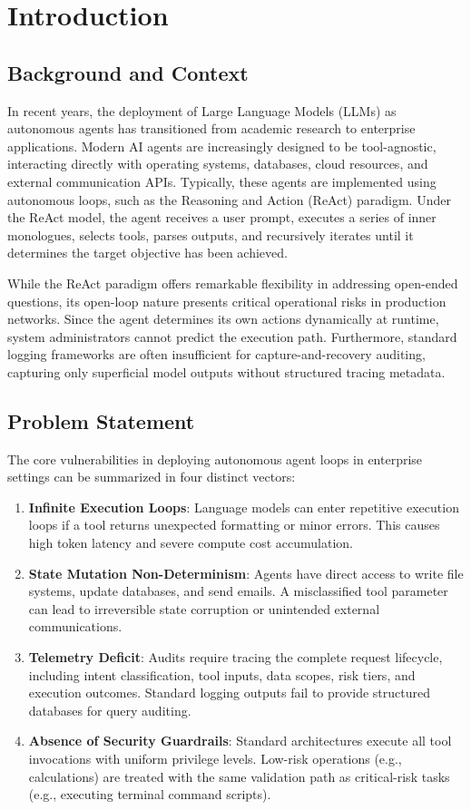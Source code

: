 \documentclass{article}
\begin{document}
\section{Introduction}

\subsection{Background and Context}
In recent years, the deployment of Large Language Models (LLMs) as autonomous agents has transitioned from academic research to enterprise applications. Modern AI agents are increasingly designed to be tool-agnostic, interacting directly with operating systems, databases, cloud resources, and external communication APIs. Typically, these agents are implemented using autonomous loops, such as the Reasoning and Action (ReAct) paradigm. Under the ReAct model, the agent receives a user prompt, executes a series of inner monologues, selects tools, parses outputs, and recursively iterates until it determines the target objective has been achieved. 

While the ReAct paradigm offers remarkable flexibility in addressing open-ended questions, its open-loop nature presents critical operational risks in production networks. Since the agent determines its own actions dynamically at runtime, system administrators cannot predict the execution path. Furthermore, standard logging frameworks are often insufficient for capture-and-recovery auditing, capturing only superficial model outputs without structured tracing metadata.

\subsection{Problem Statement}
The core vulnerabilities in deploying autonomous agent loops in enterprise settings can be summarized in four distinct vectors:
\begin{enumerate}
    \item \textbf{Infinite Execution Loops}: Language models can enter repetitive execution loops if a tool returns unexpected formatting or minor errors. This causes high token latency and severe compute cost accumulation.
    \item \textbf{State Mutation Non-Determinism}: Agents have direct access to write file systems, update databases, and send emails. A misclassified tool parameter can lead to irreversible state corruption or unintended external communications.
    \item \textbf{Telemetry Deficit}: Audits require tracing the complete request lifecycle, including intent classification, tool inputs, data scopes, risk tiers, and execution outcomes. Standard logging outputs fail to provide structured databases for query auditing.
    \item \textbf{Absence of Security Guardrails}: Standard architectures execute all tool invocations with uniform privilege levels. Low-risk operations (e.g., calculations) are treated with the same validation path as critical-risk tasks (e.g., executing terminal command scripts).
\end{enumerate}
\end{document}
